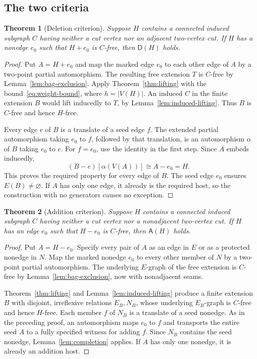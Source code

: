 \documentclass[11pt,reqno]{amsart}
\newtheorem{theorem}{Theorem}[section]
\theoremstyle{definition}
\theoremstyle{remark}
\newcommand{\Dsat}{\mathsf{D}}
\newcommand{\Asat}{\mathsf{A}}
\begin{document}
\subsection{The two criteria}

\begin{theorem}[Deletion criterion]\label{thm:deletion-criterion}
Suppose $H$ contains a connected induced subgraph $C$ having neither a cut vertex nor an adjacent two-vertex cut. If $H$ has a nonedge $e_0$ such that $H+e_0$ is $C$-free, then $\Dsat(H)$ holds.
\end{theorem}
\begin{proof}
Put $A=H+e_0$ and map the marked edge $e_0$ to each other edge of $A$ by a two-point partial automorphism. The resulting free extension $T$ is $C$-free by Lemma~\ref{lem:bag-exclusion}. Apply Theorem~\ref{thm:lifting} with the bound~\eqref{eq:weight-bound}, where $h=|V(H)|$. An induced $C$ in the finite extension $B$ would lift inducedly to $T$, by Lemma~\ref{lem:induced-lifting}. Thus $B$ is $C$-free and hence $H$-free.

Every edge $e$ of $B$ is a translate of a seed edge $f$. The extended partial automorphism taking $e_0$ to $f$, followed by that translation, is an automorphism $\alpha$ of $B$ taking $e_0$ to $e$. For $f=e_0$, use the identity in the first step. Since $A$ embeds inducedly,
\[
 (B-e)[\alpha(V(A))]\cong A-e_0=H.
\]
This proves the required property for every edge of $B$. The seed edge $e_0$ ensures $E(B)\ne\varnothing$. If $A$ has only one edge, it already is the required host, so the construction with no generators causes no exception.
\end{proof}

\begin{theorem}[Addition criterion]\label{thm:addition-criterion}
Suppose $H$ contains a connected induced subgraph $C$ having neither a cut vertex nor a nonadjacent two-vertex cut. If $H$ has an edge $e_0$ such that $H-e_0$ is $C$-free, then $\Asat(H)$ holds.
\end{theorem}
\begin{proof}
Put $A=H-e_0$. Specify every pair of $A$ as an edge in $E$ or as a protected nonedge in $N$. Map the marked nonedge $e_0$ to every other member of $N$ by a two-point partial automorphism. The underlying $E$-graph of the free extension is $C$-free by Lemma~\ref{lem:bag-exclusion}, now with nonadjacent seams.

Theorem~\ref{thm:lifting} and Lemma~\ref{lem:induced-lifting} produce a finite extension $B$ with disjoint, irreflexive relations $E_B,N_B$, whose underlying $E_B$-graph is $C$-free and hence $H$-free. Each member $f$ of $N_B$ is a translate of a seed nonedge. As in the preceding proof, an automorphism maps $e_0$ to $f$ and transports the entire seed $A$ to a fully specified witness for adding $f$. Since $N_B$ contains the seed nonedge, Lemma~\ref{lem:completion} applies. If $A$ has only one nonedge, it is already an addition host.
\end{proof}
\end{document}

